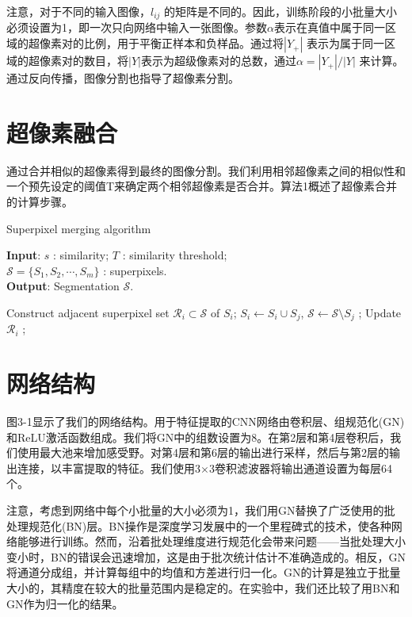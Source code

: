 注意，对于不同的输入图像，$l_{ij}$ 的矩阵是不同的。因此，训练阶段的小批量大小必须设置为1，即一次只向网络中输入一张图像。参数$\alpha$表示在真值中属于同一区域的超像素对的比例，用于平衡正样本和负样品。通过将$|Y_+|$ 表示为属于同一区域的超像素对的数目，将$|Y|$表示为超级像素对的总数，通过$\alpha  = \left | Y_{+}\right | / \left | Y \right |$ 来计算。通过反向传播，图像分割也指导了超像素分割。

\section{超像素融合}

通过合并相似的超像素得到最终的图像分割。我们利用相邻超像素之间的相似性和一个预先设定的阈值T来确定两个相邻超像素是否合并。算法1概述了超像素合并的计算步骤。
\begin{algorithm}[h]
  \caption{Superpixel merging algorithm}
  \textbf{Input}: $s$ : similarity;
  \hspace*{2em} $T$ : similarity threshold;\\
  \hspace*{2.5em} $\mathcal{S}=\{S_{1}, S_{2},\cdots, S_{m}\}$ : superpixels.\\
  \textbf{Output}: Segmentation $\mathcal{S}$.
  \begin{algorithmic}[1]
    \State Construct adjacent superpixel set $\mathcal{R}_{i}\subset \mathcal{S}$ of $S_i$;
                \State$S_{i} \gets S_{i}\cup S_{j}$, $\mathcal{S} \gets \mathcal{S} \setminus S_{j}$ ;
                \State Update $\mathcal{R}_i$ ;
            \EndIf
        \EndFor
    \EndFor
    \label{algorithm1}
  \end{algorithmic}
\end{algorithm}

\section{网络结构}

图3-1显示了我们的网络结构。用于特征提取的CNN网络由卷积层、组规范化(GN)和ReLU激活函数组成。我们将GN中的组数设置为8。在第2层和第4层卷积后，我们使用最大池来增加感受野。对第4层和第6层的输出进行采样，然后与第2层的输出连接，以丰富提取的特征。我们使用3$\times $3卷积滤波器将输出通道设置为每层64个。

注意，考虑到网络中每个小批量的大小必须为1，我们用GN替换了广泛使用的批处理规范化(BN)层。BN操作是深度学习发展中的一个里程碑式的技术，使各种网络能够进行训练。然而，沿着批处理维度进行规范化会带来问题——当批处理大小变小时，BN的错误会迅速增加，这是由于批次统计估计不准确造成的。相反，GN将通道分成组，并计算每组中的均值和方差进行归一化。GN的计算是独立于批量大小的，其精度在较大的批量范围内是稳定的。在实验中，我们还比较了用BN和GN作为归一化的结果。

